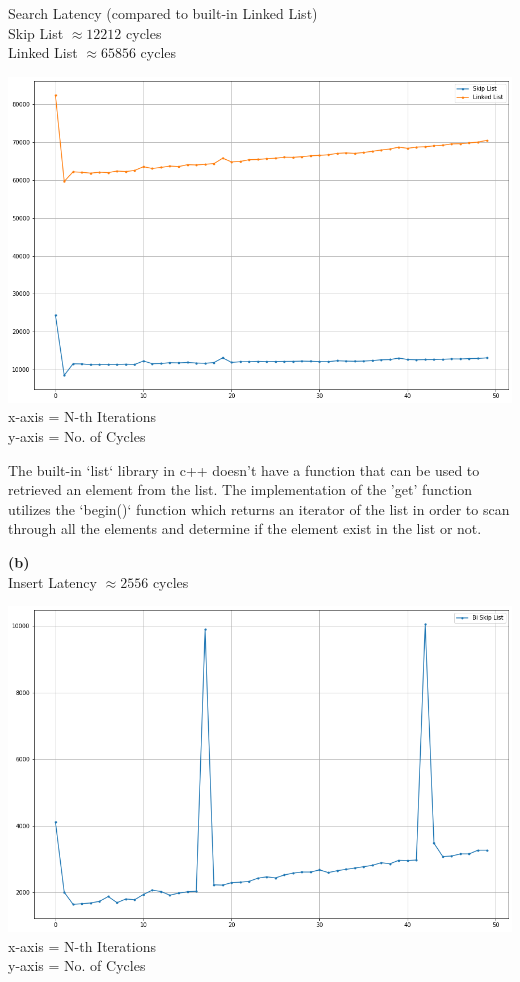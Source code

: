 \documentclass[a4paper, 11pt]{article}
\renewcommand{\part}[1] {\vspace{.10in} {\bf (#1)}}
\begin{document}
Search Latency (compared to built-in Linked List) \\
Skip List $\approx 12212$ cycles \\
Linked List $\approx 65856$ cycles 

\begin{center}
  \includegraphics[width=15cm]{p3a2}
  x-axis = N-th Iterations\\
  y-axis = No. of Cycles
\end{center}

The built-in `list` library in c++ doesn't have a function that can be used to retrieved an element from the list.
The implementation of the 'get' function utilizes the `begin()` function which returns an iterator of the list in order 
to scan through all the elements and determine if the element exist in the list or not.

\part{b} \\
Insert Latency $\approx 2556$ cycles \\
\begin{center}
  \includegraphics[width=15cm]{p3b1}
  x-axis = N-th Iterations\\
  y-axis = No. of Cycles
\end{center}
\end{document}
